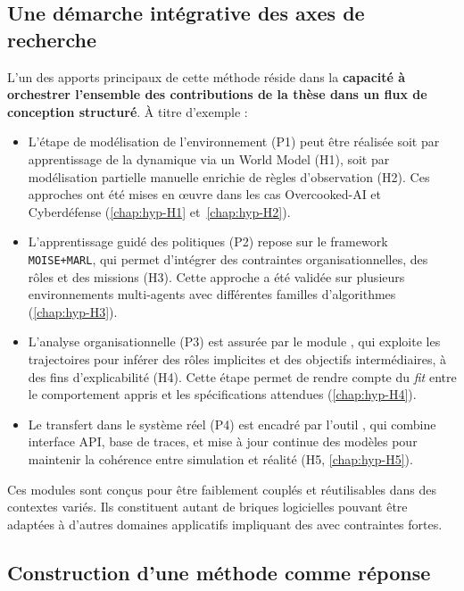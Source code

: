 \subsection{Une démarche intégrative des axes de recherche}
L'un des apports principaux de cette méthode réside dans la \textbf{capacité à orchestrer l'ensemble des contributions de la thèse dans un flux de conception structuré}. À titre d'exemple :

\begin{itemize}
    \item L'étape de modélisation de l'environnement (P1) peut être réalisée soit par apprentissage de la dynamique via un World Model (H1), soit par modélisation partielle manuelle enrichie de règles d'observation (H2). Ces approches ont été mises en œuvre dans les cas Overcooked-AI et Cyberdéfense (\autoref{chap:hyp-H1} et~\autoref{chap:hyp-H2}).

    \item L'apprentissage guidé des politiques (P2) repose sur le framework \texttt{MOISE+MARL}, qui permet d'intégrer des contraintes organisationnelles, des rôles et des missions (H3). Cette approche a été validée sur plusieurs environnements multi-agents avec différentes familles d'algorithmes (\autoref{chap:hyp-H3}).

    \item L'analyse organisationnelle (P3) est assurée par le module , qui exploite les trajectoires pour inférer des rôles implicites et des objectifs intermédiaires, à des fins d'explicabilité (H4). Cette étape permet de rendre compte du \textit{fit} entre le comportement appris et les spécifications attendues (\autoref{chap:hyp-H4}).

    \item Le transfert dans le système réel (P4) est encadré par l'outil , qui combine interface API, base de traces, et mise à jour continue des modèles pour maintenir la cohérence entre simulation et réalité (H5, \autoref{chap:hyp-H5}).
\end{itemize}

Ces modules sont conçus pour être faiblement couplés et réutilisables dans des contextes variés. Ils constituent autant de briques logicielles pouvant être adaptées à d'autres domaines applicatifs impliquant des  avec contraintes fortes.



\subsection{Construction d'une méthode comme réponse}

